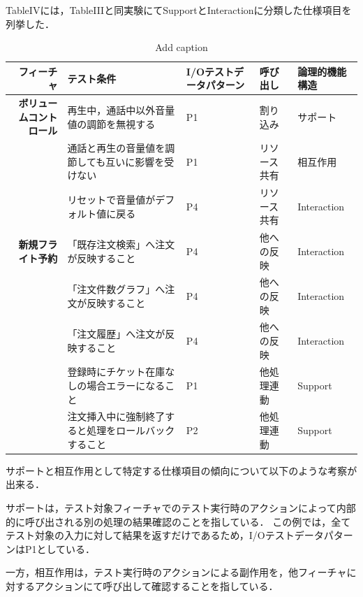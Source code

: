TableIVには，TableIIIと同実験にてSupportとInteractionに分類した仕様項目を列挙した．

\begin{table}[htbp]
  \centering
  \caption{Add caption}
    \begin{tabular}{|r|p{8em}|p{4em}|p{4em}|p{5em}|}
    \hline
    \multicolumn{1}{|p{4em}|}{\textbf{フィーチャ}} & \textbf{テスト条件} & \textbf{I/Oテストデータパターン} & \textbf{呼び出し} & \textbf{論理的機能構造} \bigstrut\\
    \hline
    \multicolumn{1}{|p{4em}|}{\textbf{ボリュームコントロール}} & 再生中，通話中以外音量値の調節を無視する & P1　   & 割り込み  & サポート \bigstrut\\
\cline{2-5}          & 通話と再生の音量値を調節しても互いに影響を受けない & P1    & リソース共有 & 相互作用 \bigstrut\\
\cline{2-5}          & リセットで音量値がデフォルト値に戻る & P4　　  & リソース共有 & Interaction \bigstrut\\
    \hline
    \multicolumn{1}{|p{4em}|}{\textbf{新規フライト予約}} & 「既存注文検索」へ注文が反映すること & P4　   & 他への反映 & Interaction \bigstrut\\
\cline{2-5}          & 「注文件数グラフ」へ注文が反映すること & P4　   & 他への反映 & Interaction \bigstrut\\
\cline{2-5}          & 「注文履歴」へ注文が反映すること & P4    & 他への反映 & Interaction \bigstrut\\
\cline{2-5}          & 登録時にチケット在庫なしの場合エラーになること & P1    & 他処理連動 & Support \bigstrut\\
\cline{2-5}          & 注文挿入中に強制終了すると処理をロールバックすること & P2    & 他処理連動 & Support \bigstrut\\
    \hline
    \end{tabular}%
  \label{tab:addlabel}%
\end{table}%

サポートと相互作用として特定する仕様項目の傾向について以下のような考察が出来る．

サポートは，テスト対象フィーチャでのテスト実行時のアクションによって内部的に呼び出される別の処理の結果確認のことを指している．
この例では，全てテスト対象の入力に対して結果を返すだけであるため，I/OテストデータパターンはP1としている．

一方，相互作用は，テスト実行時のアクションによる副作用を，他フィーチャに対するアクションにて呼び出して確認することを指している．

